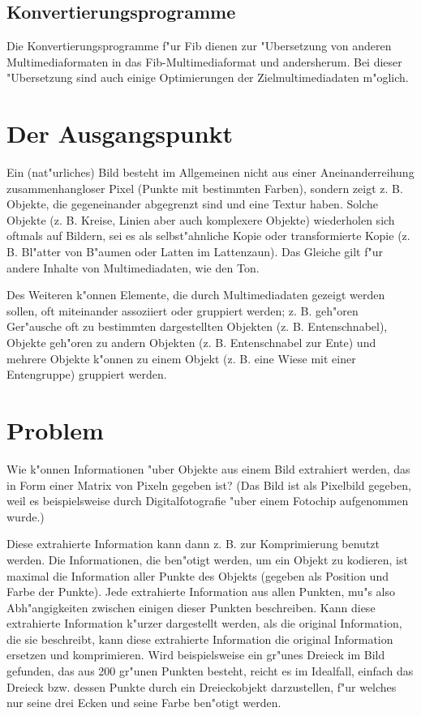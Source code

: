 \documentclass[11pt,a4paper]{article}
\begin{document}
\subsection{Konvertierungsprogramme}

Die Konvertierungsprogramme f"ur Fib dienen zur "Ubersetzung von anderen Multimediaformaten in das Fib-Multimediaformat und andersherum. Bei dieser "Ubersetzung sind auch einige Optimierungen der Zielmultimediadaten m"oglich.





\section{Der Ausgangspunkt}

Ein (nat"urliches) Bild besteht im Allgemeinen nicht aus einer Aneinanderreihung zusammenhangloser Pixel (Punkte mit bestimmten Farben), sondern zeigt z. B. Objekte, die gegeneinander abgegrenzt sind und eine Textur haben. Solche Objekte (z. B. Kreise, Linien aber auch komplexere Objekte) wiederholen sich oftmals auf Bildern, sei es als selbst"ahnliche Kopie oder transformierte Kopie (z. B. Bl"atter von B"aumen oder Latten im Lattenzaun). Das Gleiche gilt f"ur andere Inhalte von Multimediadaten, wie den Ton.

Des Weiteren k"onnen Elemente, die durch Multimediadaten gezeigt werden sollen, oft miteinander assoziiert oder gruppiert werden; z. B. geh"oren Ger"ausche oft zu bestimmten dargestellten Objekten (z. B. Entenschnabel), Objekte geh"oren zu andern Objekten (z. B. Entenschnabel zur Ente) und mehrere Objekte  k"onnen zu einem Objekt (z. B. eine Wiese mit einer Entengruppe) gruppiert werden.


\section{Problem}
\label{secProblem}

Wie k"onnen Informationen "uber Objekte aus einem Bild extrahiert werden, das in Form einer Matrix von Pixeln gegeben ist? (Das Bild ist als Pixelbild gegeben, weil es beispielsweise durch Digitalfotografie "uber einem Fotochip aufgenommen wurde.)

Diese extrahierte Information kann dann z. B. zur Komprimierung benutzt werden. Die Informationen, die ben"otigt werden, um ein Objekt zu kodieren, ist maximal die Information aller Punkte des Objekts (gegeben als Position und Farbe der Punkte). Jede extrahierte Information aus allen Punkten, mu"s also Abh"angigkeiten zwischen einigen dieser Punkten beschreiben. Kann diese extrahierte Information k"urzer dargestellt werden, als die original Information, die sie beschreibt, kann diese extrahierte Information die original Information ersetzen und komprimieren.
Wird beispielsweise ein gr"unes Dreieck im Bild gefunden, das aus 200 gr"unen Punkten besteht, reicht es im Idealfall, einfach das Dreieck bzw. dessen Punkte durch ein Dreieckobjekt darzustellen, f"ur welches nur seine drei Ecken und seine Farbe ben"otigt werden.
\end{document}
